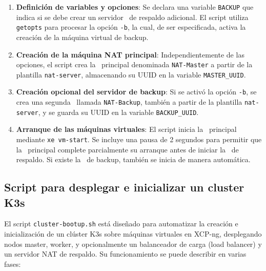 \begin{enumerate}
    \item \textbf{Definición de variables y opciones}:  
    Se declara una variable \texttt{BACKUP} que indica si se debe crear un servidor \NAT\ de respaldo adicional. El script utiliza \texttt{getopts} para procesar la opción \texttt{-b}, la cual, de ser especificada, activa la creación de la máquina virtual de backup.

    \item \textbf{Creación de la máquina NAT principal}:  
    Independientemente de las opciones, el script crea la \VM\ principal denominada \texttt{NAT-Master} a partir de la plantilla \texttt{nat-server}, almacenando su UUID en la variable \texttt{MASTER\_UUID}.

    \item \textbf{Creación opcional del servidor de backup}:  
    Si se activó la opción \texttt{-b}, se crea una segunda \VM\ llamada \texttt{NAT-Backup}, también a partir de la plantilla \texttt{nat-server}, y se guarda su UUID en la variable \texttt{BACKUP\_UUID}.

    \item \textbf{Arranque de las máquinas virtuales}:  
    El script inicia la \VM\ principal mediante \texttt{xe vm-start}. Se incluye una pausa de 2 segundos para permitir que la \VM\ principal complete parcialmente su arranque antes de iniciar la \VM\ de respaldo. Si existe la \VM\ de backup, también se inicia de manera automática.

\end{enumerate}



\subsection{Script para desplegar e inicializar un cluster K3s}
\noindent
El script \texttt{cluster-bootup.sh} está diseñado para automatizar la creación e inicialización de un clúster K3s sobre máquinas virtuales en XCP-ng, desplegando nodos master, worker, y opcionalmente un balanceador de carga (load balancer) y un servidor NAT de respaldo. Su funcionamiento se puede describir en varias fases:

